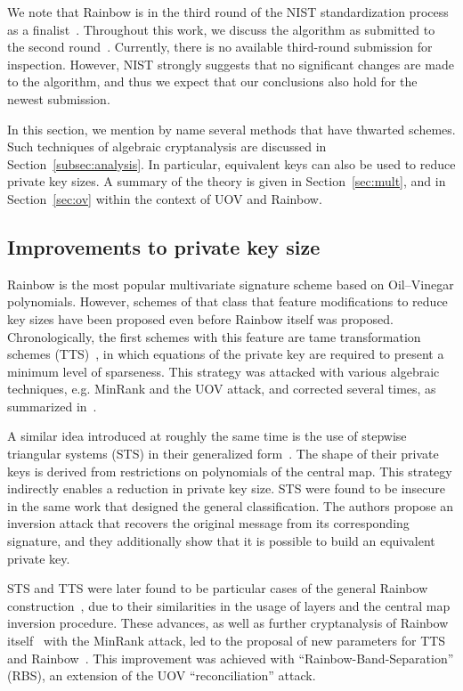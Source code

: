 \documentclass[english]{ufsc-thesis-rn46-2019/ufsc-thesis-rn46-2019}
\theoremstyle{definition}
\begin{document}
We note that Rainbow is in the third round of the NIST standardization process
as a finalist~\cite[Sec.~3.20]{Alagic:202007}. Throughout this work, we discuss
the algorithm as submitted to the second round~\cite{Ding:201901}. Currently,
there is no available third-round submission for inspection. However, NIST
strongly suggests that no significant changes are made to the algorithm, and
thus we expect that our conclusions also hold for the newest submission.

In this section, we mention by name several methods that have thwarted
schemes. Such techniques of algebraic cryptanalysis are discussed in
Section~\ref{subsec:analysis}. In particular, equivalent keys can also be used
to reduce private key sizes. A summary of the theory is given in
Section~\ref{sec:mult}, and in Section~\ref{sec:ov} within the context of UOV
and Rainbow.

\subsection{Improvements to private key size}\label{subsec:priv}

Rainbow is the most popular multivariate signature scheme based on Oil--Vinegar
polynomials. However, schemes of that class that feature modifications to
reduce key sizes have been proposed even before Rainbow itself was
proposed. Chronologically, the first schemes with this feature are tame
transformation schemes (TTS)~\cite{Chen:200210}, in which equations of the
private key are required to present a minimum level of sparseness. This
strategy was attacked with various algebraic techniques, e.g. MinRank and the
UOV attack, and corrected several times, as summarized in~\cite{Ding:200604}.

A similar idea introduced at roughly the same time is the use of stepwise
triangular systems (STS) in their generalized form~\cite{Wolf:200603}. The
shape of their private keys is derived from restrictions on polynomials of the
central map. This strategy indirectly enables a reduction in private key
size. STS were found to be insecure in the same work that designed the general
classification. The authors propose an inversion attack that recovers the
original message from its corresponding signature, and they additionally show
that it is possible to build an equivalent private key.

STS and TTS were later found to be particular cases of the general Rainbow
construction~\cite{Ding:200806}, due to their similarities in the usage of
layers and the central map inversion procedure. These advances, as well as
further cryptanalysis of Rainbow itself~\cite{Billet:200609} with the MinRank
attack, led to the proposal of new parameters for TTS and
Rainbow~\cite{Ding:200806}. This improvement was achieved with
``Rainbow-Band-Separation'' (RBS), an extension of the UOV ``reconciliation''
attack.
\end{document}

